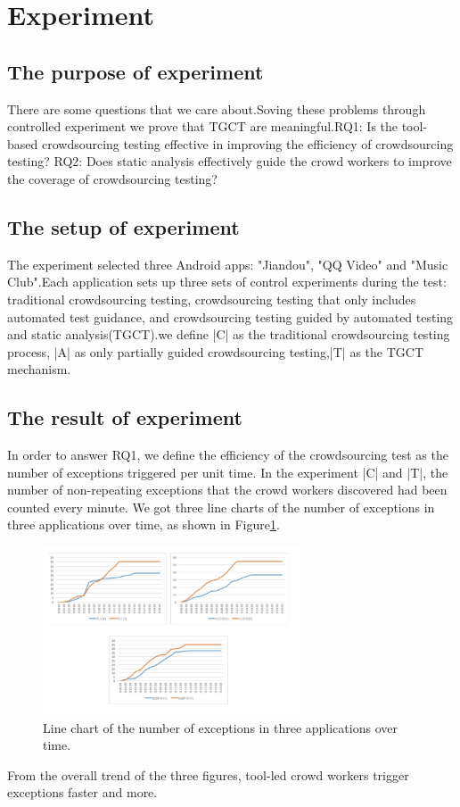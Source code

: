 \section{Experiment}

\subsection{The purpose of experiment}
There are some questions that we care about.Soving these problems through controlled experiment we prove that TGCT are meaningful.RQ1: Is the tool-based crowdsourcing testing effective in improving the efficiency of crowdsourcing testing? RQ2: Does static analysis effectively guide the crowd workers to improve the coverage of crowdsourcing testing? 

\subsection{The setup of experiment}
The experiment selected three Android apps: "Jiandou", "QQ Video" and "Music Club".Each application sets up three sets of control experiments during the test: traditional crowdsourcing testing, crowdsourcing testing that only includes automated test guidance, and crowdsourcing testing guided by automated testing and static analysis(TGCT).we define |C| as the traditional crowdsourcing testing process, |A| as only partially guided crowdsourcing testing,|T| as the TGCT mechanism.

\subsection{The result of experiment}
In order to answer RQ1, we define the efficiency of the crowdsourcing test as the number of exceptions triggered per unit time. In the experiment |C| and |T|, the number of non-repeating exceptions that the crowd workers discovered had been counted every minute. We got three line charts of the number of exceptions in three applications over time, as shown in Figure\ref{fig:xi}.
\begin{figure}[htbp]
\centering
\centerline{\includegraphics[width=\columnwidth,height=5cm]{fig/8.png}}
\caption{Line chart of the number of exceptions in three applications over time.}
\label{fig:xi}
\end{figure}
From the overall trend of the three figures, tool-led crowd workers trigger exceptions faster and more.

